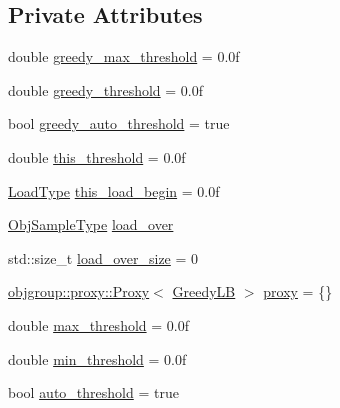 \subsection*{Private Attributes}
\begin{DoxyCompactItemize}
\item 
double \hyperlink{structvt_1_1vrt_1_1collection_1_1lb_1_1_greedy_l_b_a39732795380da044f7f5e80dd9ad5c19}{greedy\+\_\+max\+\_\+threshold} = 0.\+0f
\item 
double \hyperlink{structvt_1_1vrt_1_1collection_1_1lb_1_1_greedy_l_b_ac7f68836b0d83f2da50984d228818f3e}{greedy\+\_\+threshold} = 0.\+0f
\item 
bool \hyperlink{structvt_1_1vrt_1_1collection_1_1lb_1_1_greedy_l_b_a653ce2d6e5345aee1b5183a0e24a5da7}{greedy\+\_\+auto\+\_\+threshold} = true
\item 
double \hyperlink{structvt_1_1vrt_1_1collection_1_1lb_1_1_greedy_l_b_afd457b0829f152767e1aa5b07d7652ef}{this\+\_\+threshold} = 0.\+0f
\item 
\hyperlink{structvt_1_1vrt_1_1collection_1_1lb_1_1_base_l_b_a215e22b9f12678303f49615ae3be05cc}{Load\+Type} \hyperlink{structvt_1_1vrt_1_1collection_1_1lb_1_1_greedy_l_b_a95beecba794f8ac758242f1507a6d0ab}{this\+\_\+load\+\_\+begin} = 0.\+0f
\item 
\hyperlink{structvt_1_1vrt_1_1collection_1_1lb_1_1_base_l_b_a331d7da5bbf2883238427d86b54ddd7b}{Obj\+Sample\+Type} \hyperlink{structvt_1_1vrt_1_1collection_1_1lb_1_1_greedy_l_b_ae2701a450913d33bf8767164976b6e4c}{load\+\_\+over}
\item 
std\+::size\+\_\+t \hyperlink{structvt_1_1vrt_1_1collection_1_1lb_1_1_greedy_l_b_a6d7a28365584f9892dc60aed43b9a814}{load\+\_\+over\+\_\+size} = 0
\item 
\hyperlink{structvt_1_1objgroup_1_1proxy_1_1_proxy}{objgroup\+::proxy\+::\+Proxy}$<$ \hyperlink{structvt_1_1vrt_1_1collection_1_1lb_1_1_greedy_l_b}{Greedy\+LB} $>$ \hyperlink{structvt_1_1vrt_1_1collection_1_1lb_1_1_greedy_l_b_ac121b6c8cafc463423b0ce7bdfb43806}{proxy} = \{\}
\item 
double \hyperlink{structvt_1_1vrt_1_1collection_1_1lb_1_1_greedy_l_b_a3134b75d2fd3ff63faa6a41b4c7b3dae}{max\+\_\+threshold} = 0.\+0f
\item 
double \hyperlink{structvt_1_1vrt_1_1collection_1_1lb_1_1_greedy_l_b_ae3d436ffc085fb846a1970018c593985}{min\+\_\+threshold} = 0.\+0f
\item 
bool \hyperlink{structvt_1_1vrt_1_1collection_1_1lb_1_1_greedy_l_b_a480ec7c5fa24215d70d34901f0549ff0}{auto\+\_\+threshold} = true
\end{DoxyCompactItemize}
